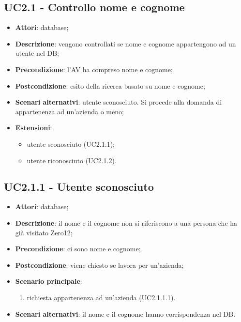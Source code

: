\documentclass[../AnalisiDeiRequisiti.tex]{subfiles}
\begin{document}
\subsection{UC2.1 - Controllo nome e cognome} 
\label{sssec:UC2.1} 
\begin{itemize} 
\item \textbf{Attori}: database;
\item \textbf{Descrizione}: vengono controllati se nome e cognome  appartengono ad un utente nel DB;
\item \textbf{Precondizione}: l'AV ha compreso nome e cognome;
\item \textbf{Postcondizione}: esito della ricerca basato su nome e cognome;
\item \textbf{Scenari alternativi}: utente sconosciuto. Si procede alla domanda di appartenenza ad un'azienda o meno;
\item \textbf{Estensioni}:\begin{itemize}\item utente sconosciuto (UC2.1.1);\item utente riconosciuto (UC2.1.2).\end{itemize}
\end{itemize} 
\subsection{UC2.1.1 - Utente sconosciuto} 
\label{sssec:UC2.1.1} 
\begin{itemize} 
\item \textbf{Attori}: database;
\item \textbf{Descrizione}: il nome e il cognome non si riferiscono a una persona che ha già visitato Zero12;
\item \textbf{Precondizione}: ci sono nome e cognome;
\item \textbf{Postcondizione}: viene chiesto se lavora per un'azienda;
\item \textbf{Scenario principale}: \begin{enumerate}\item richiesta appartenenza ad un'azienda (UC2.1.1.1). 
 \end{enumerate}
\item \textbf{Scenari alternativi}: il nome e il cognome hanno corrispondenza nel DB.
\end{itemize} 
\end{document}
